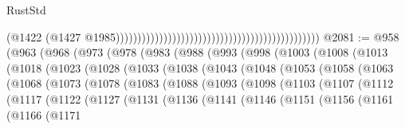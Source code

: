 \begin{lexlean}{RustStd}
\begin{coremodule}
{\begin{coremodule}
{{{{{{{{{{{{                                                                                              (@1422
                                                                                                (@1427
                                                                                                  @1985)))))))))))))))))))))))))))))))))))))))))))))))
@2081 := @958
    (@963
      (@968
        (@973
          (@978
            (@983
              (@988
                (@993
                  (@998
                    (@1003
                      (@1008
                        (@1013
                          (@1018
                            (@1023
                              (@1028
                                (@1033
                                  (@1038
                                    (@1043
                                      (@1048
                                        (@1053
                                          (@1058
                                            (@1063
                                              (@1068
                                                (@1073
                                                  (@1078
                                                    (@1083
                                                      (@1088
                                                        (@1093
                                                          (@1098
                                                            (@1103
                                                              (@1107
                                                                (@1112
                                                                  (@1117
                                                                    (@1122
                                                                      (@1127
                                                                        (@1131
                                                                          (@1136
                                                                            (@1141
                                                                              (@1146
                                                                                (@1151
                                                                                  (@1156
                                                                                    (@1161
                                                                                      (@1166
                                                                                        (@1171
}}}}}}}}}}}}
\end{coremodule}}
\end{coremodule}
\end{lexlean}

